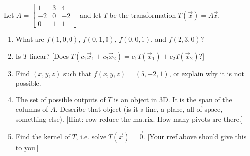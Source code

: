 % 
%   
% 







\mysubsection{\idealin}
\begin{problem}
 Let
$A=
\begin{bmatrix}
 1&3&4\\
 -2&0&-2\\
 0&1&1
\end{bmatrix}
$ and let  $T$ be the transformation  $T(\vec x) = A\vec x$.
\begin{enumerate}
 \item What are $f(1,0,0)$, $f(0,1,0)$, $f(0,0,1)$, and $f(2,3,0)$? 
 \item Is  $T$ linear?  [Does $T(c_1\vec x_1+c_2\vec x_2) =c_1T(\vec x_1)+c_2T(\vec x_2)$?] 
 \item Find $(x,y,z)$ such that $f(x,y,z)=(5,-2,1)$, or explain why it is not possible.
 \item The set of possible outputs of $T$ is an object in 3D. It is the span of the columns of $A$. Describe that object (is it a line, a plane, all of space, something else). [Hint: row reduce the matrix. How many pivots are there.] 
 \item Find the kernel of $T$, i.e. solve $T(\vec x)=\vec 0$. [Your rref above should give this to you.]  
\end{enumerate}
\end{problem}

